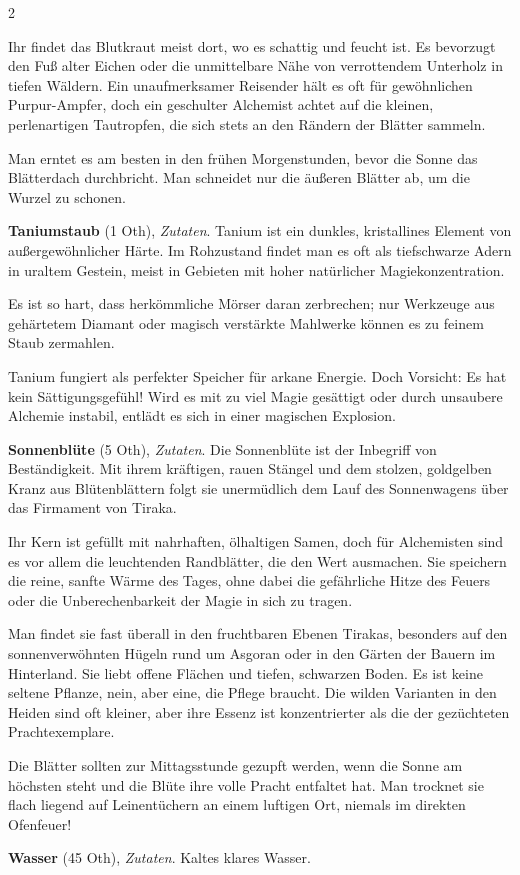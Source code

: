 \begin{multicols}{2}
\begin{denseitemize}
Ihr findet das Blutkraut meist dort, wo es schattig und feucht ist. Es bevorzugt den Fuß alter Eichen oder die unmittelbare Nähe von verrottendem Unterholz in tiefen Wäldern. Ein unaufmerksamer Reisender hält es oft für gewöhnlichen Purpur-Ampfer, doch ein geschulter Alchemist achtet auf die kleinen, perlenartigen Tautropfen, die sich stets an den Rändern der Blätter sammeln.

Man erntet es am besten in den frühen Morgenstunden, bevor die Sonne das Blätterdach durchbricht. Man schneidet nur die äußeren Blätter ab, um die Wurzel zu schonen.
        \item \textbf{Taniumstaub} (1 Oth), \textit{Zutaten}.
        Tanium ist ein dunkles, kristallines Element von außergewöhnlicher Härte. Im Rohzustand findet man es oft als tiefschwarze Adern in uraltem Gestein, meist in Gebieten mit hoher natürlicher Magiekonzentration.

Es ist so hart, dass herkömmliche Mörser daran zerbrechen; nur Werkzeuge aus gehärtetem Diamant oder magisch verstärkte Mahlwerke können es zu feinem Staub zermahlen.

Tanium fungiert als perfekter Speicher für arkane Energie. Doch Vorsicht: Es hat kein Sättigungsgefühl! Wird es mit zu viel Magie gesättigt oder durch unsaubere Alchemie instabil, entlädt es sich in einer magischen Explosion.
        \item \textbf{Sonnenblüte} (5 Oth), \textit{Zutaten}.
        Die Sonnenblüte ist der Inbegriff von Beständigkeit. Mit ihrem kräftigen, rauen Stängel und dem stolzen, goldgelben Kranz aus Blütenblättern folgt sie unermüdlich dem Lauf des Sonnenwagens über das Firmament von Tiraka.

Ihr Kern ist gefüllt mit nahrhaften, ölhaltigen Samen, doch für Alchemisten sind es vor allem die leuchtenden Randblätter, die den Wert ausmachen. Sie speichern die reine, sanfte Wärme des Tages, ohne dabei die gefährliche Hitze des Feuers oder die Unberechenbarkeit der Magie in sich zu tragen.

Man findet sie fast überall in den fruchtbaren Ebenen Tirakas, besonders auf den sonnenverwöhnten Hügeln rund um Asgoran oder in den Gärten der Bauern im Hinterland. Sie liebt offene Flächen und tiefen, schwarzen Boden. Es ist keine seltene Pflanze, nein, aber eine, die Pflege braucht. Die wilden Varianten in den Heiden sind oft kleiner, aber ihre Essenz ist konzentrierter als die der gezüchteten Prachtexemplare.

Die Blätter sollten zur Mittagsstunde gezupft werden, wenn die Sonne am höchsten steht und die Blüte ihre volle Pracht entfaltet hat. Man trocknet sie flach liegend auf Leinentüchern an einem luftigen Ort, niemals im direkten Ofenfeuer!
        \item \textbf{Wasser} (45 Oth), \textit{Zutaten}.
        Kaltes klares Wasser.
    \end{denseitemize}



\end{multicols}
